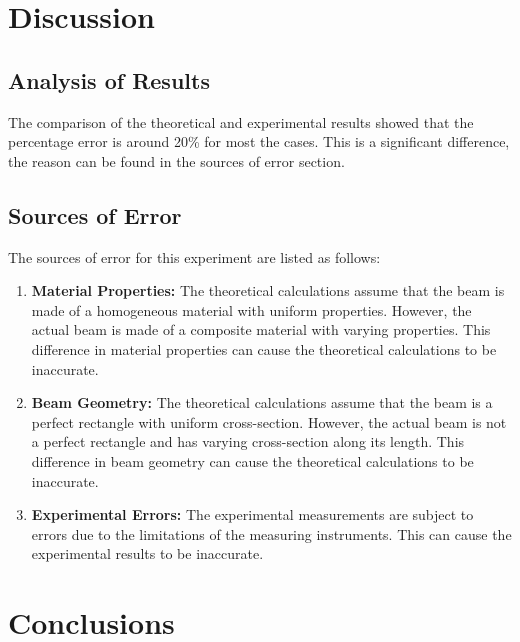 \documentclass[12pt, titlepage]{article}
\begin{document}
\section{Discussion}
\subsection{Analysis of Results}
The comparison of the theoretical and experimental results showed that the
percentage error is around 20\% for most the cases. This is a significant
difference, the reason can be found in the sources of error section.
\subsection{Sources of Error}
The sources of error for this experiment are listed as follows:
\begin{enumerate}
    \item \textbf{Material Properties:} The theoretical calculations assume
      that the beam is made of a homogeneous material with uniform properties.
      However, the actual beam is made of a composite material with varying
      properties. This difference in material properties can cause the
      theoretical calculations to be inaccurate.
    
    \item \textbf{Beam Geometry:} The theoretical calculations assume that the
      beam is a perfect rectangle with uniform cross-section. However, the
      actual beam is not a perfect rectangle and has varying cross-section
      along its length. This difference in beam geometry can cause the
      theoretical calculations to be inaccurate.
    
    \item \textbf{Experimental Errors:} The experimental measurements are
      subject to errors due to the limitations of the measuring instruments.
      This can cause the experimental results to be inaccurate.
\end{enumerate}
\newpage
\section{Conclusions}
\end{document}
